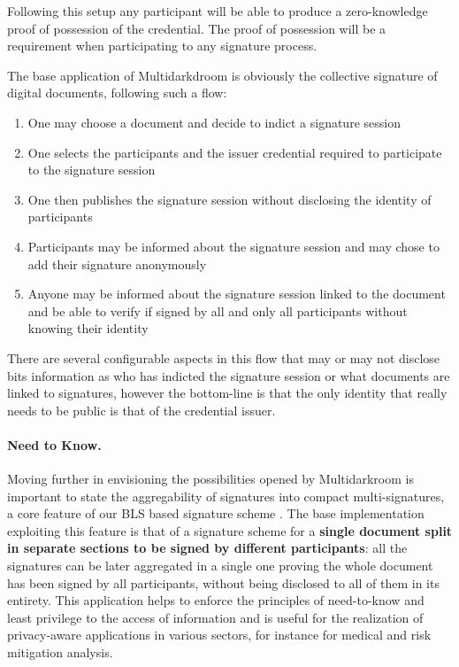 \documentclass[twocolumn]{article}
\begin{document}
Following this setup any participant will be able to produce a zero-knowledge proof of possession of the credential. The proof of possession will be a requirement when participating to any signature process.

The base application of Multidarkdroom is obviously the collective
signature of digital documents, following such a flow:

\begin{enumerate}
  \item One may choose a document and decide to indict a signature session
  \item One selects the participants and the issuer credential required to participate to the signature session
  \item One then publishes the signature session without disclosing the identity of participants
  \item Participants may be informed about the signature session and may chose to add their signature anonymously 
  \item Anyone may be informed about the signature session linked to the document and be able to verify if signed by all and only all participants without knowing their identity
\end{enumerate}

There are several configurable aspects in this flow that may or may not
disclose bits information as who has indicted the signature session or
what documents are linked to signatures, however the bottom-line is that
the only identity that really needs to be public is that of the
credential issuer. 

\paragraph*{Need to Know.}
Moving further in envisioning the possibilities opened by Multidarkroom
is important to state the aggregability of signatures into compact
multi-signatures, a core feature of our BLS based signature scheme
\citep{compact-multisig}. The base implementation exploiting this
feature is that of a signature scheme for a \textbf{single document
split in separate sections to be signed by different participants}: all
the signatures can be later aggregated in a single one proving the whole
document has been signed by all participants, without being disclosed to
all of them in its entirety. This application helps to enforce the
principles of need-to-know and least privilege to the access of
information \citep{info-protection} and is useful for the realization
of privacy-aware applications in various sectors, for instance for
medical and risk mitigation analysis.
\end{document}
